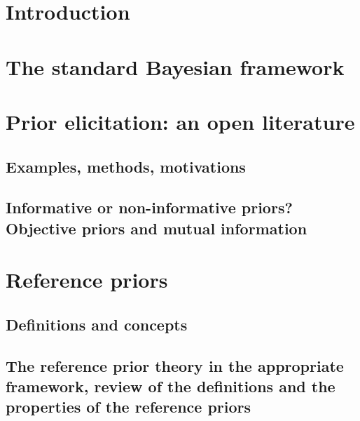 


\section{Introduction}

\section{The standard Bayesian framework}

\section{Prior elicitation: an open literature}

\subsection{Examples, methods, motivations}

\subsection{Informative or non-informative priors? Objective priors and mutual information}



\section{Reference priors}


\subsection{Definitions and concepts}


\subsection{The reference prior theory in the appropriate framework, review of the definitions and the properties of the reference priors}




